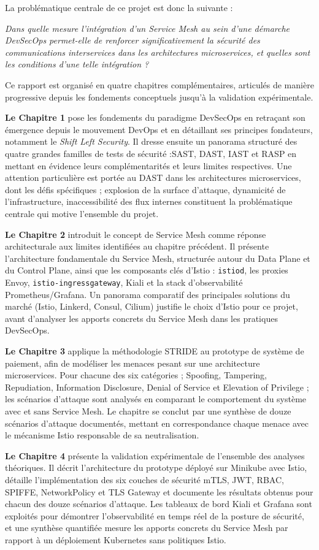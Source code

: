La problématique centrale de ce projet est donc la suivante :


  \textit{Dans quelle mesure l'intégration d'un Service Mesh au sein d'une
  démarche DevSecOps permet-elle de renforcer significativement la sécurité
  des communications interservices dans les architectures microservices, et
  quelles sont les conditions d'une telle intégration ?}



Ce rapport est organisé en quatre chapitres complémentaires, articulés de manière
progressive depuis les fondements conceptuels jusqu'à la validation expérimentale.

\textbf{Le Chapitre 1} pose les fondements du paradigme DevSecOps en retraçant
son émergence depuis le mouvement DevOps et en détaillant ses principes fondateurs,
notamment le \textit{Shift Left Security}. Il dresse ensuite un panorama structuré
des quatre grandes familles de tests de sécurité :SAST, DAST, IAST et RASP 
en mettant en évidence leurs complémentarités et leurs limites respectives.
Une attention particulière est portée au DAST dans les architectures microservices,
dont les défis spécifiques ; explosion de la surface d'attaque, dynamicité de
l'infrastructure, inaccessibilité des flux internes  constituent la problématique
centrale qui motive l'ensemble du projet.

\textbf{Le Chapitre 2} introduit le concept de Service Mesh comme réponse
architecturale aux limites identifiées au chapitre précédent. Il présente
l'architecture fondamentale du Service Mesh, structurée autour du Data Plane
et du Control Plane, ainsi que les composants clés d'Istio : \texttt{istiod},
les proxies Envoy, \texttt{istio-ingressgateway}, Kiali et la stack d'observabilité
Prometheus/Grafana. Un panorama comparatif des principales solutions du marché
(Istio, Linkerd, Consul, Cilium) justifie le choix d'Istio pour ce projet,
avant d'analyser les apports concrets du Service Mesh dans les pratiques DevSecOps.

\textbf{Le Chapitre 3} applique la méthodologie STRIDE au prototype de système
de paiement, afin de modéliser les menaces pesant sur une architecture microservices.
Pour chacune des six catégories ; Spoofing, Tampering, Repudiation, Information
Disclosure, Denial of Service et Elevation of Privilege ; les scénarios d'attaque
sont analysés en comparant le comportement du système avec et sans Service Mesh.
Le chapitre se conclut par une synthèse de douze scénarios d'attaque documentés,
mettant en correspondance chaque menace avec le mécanisme Istio responsable de
sa neutralisation.

\textbf{Le Chapitre 4} présente la validation expérimentale de l'ensemble des
analyses théoriques. Il décrit l'architecture du prototype déployé sur Minikube
avec Istio, détaille l'implémentation des six couches de sécurité  mTLS, JWT,
RBAC, SPIFFE, NetworkPolicy et TLS Gateway et documente les résultats obtenus
pour chacun des douze scénarios d'attaque. Les tableaux de bord Kiali et Grafana
sont exploités pour démontrer l'observabilité en temps réel de la posture de
sécurité, et une synthèse quantifiée mesure les apports concrets du Service Mesh
par rapport à un déploiement Kubernetes sans politiques Istio.

